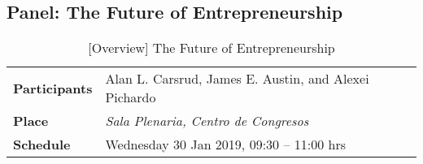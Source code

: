 \documentclass[11pt,a4paper]{article}
\begin{document}
\subsection{Panel: The Future of Entrepreneurship}\label{sec:panel1}

\parencite{Carsrud2019}
\begin{table}[h] %
\centering
\begin{tabular}{|l|l|}
\hline
\textbf{Participants} &  Alan L. Carsrud, James E. Austin, and Alexei Pichardo \\
\textbf{Place}        & \emph{Sala Plenaria, Centro de Congresos} \\
\textbf{Schedule}     & Wednesday 30 Jan 2019, 09:30 – 11:00 hrs \\
\hline
\end{tabular}
\caption{[Overview] The Future of Entrepreneurship}\label{tab:table}
\end{table}










\end{document}
